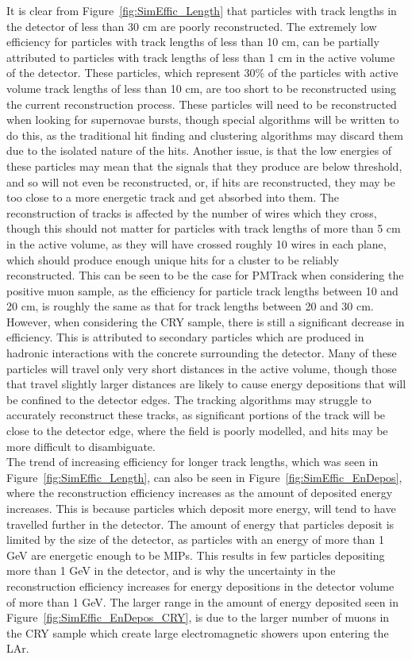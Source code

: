 It is clear from Figure~\ref{fig:SimEffic_Length} that particles with track lengths in the detector of less than 30 cm are poorly reconstructed. The extremely low efficiency for particles with track lengths of less than 10 cm, can be partially attributed to particles with track lengths of less than 1 cm in the active volume of the detector. These particles, which represent 30\% of the particles with active volume track lengths of less than 10 cm, are too short to be reconstructed using the current reconstruction process. These particles will need to be reconstructed when looking for supernovae bursts, though special algorithms will be written to do this, as the traditional hit finding and clustering algorithms may discard them due to the isolated nature of the hits. Another issue, is that the low energies of these particles may mean that the signals that they produce are below threshold, and so will not even be reconstructed, or, if hits are reconstructed, they may be too close to a more energetic track and get absorbed into them. The reconstruction of tracks is affected by the number of wires which they cross, though this should not matter for particles with track lengths of more than 5 cm in the active volume, as they will have crossed roughly 10 wires in each plane, which should produce enough unique hits for a cluster to be reliably reconstructed. This can be seen to be the case for PMTrack when considering the positive muon sample, as the efficiency for particle track lengths between 10 and 20 cm, is roughly the same as that for track lengths between 20 and 30 cm. However, when considering the CRY sample, there is still a significant decrease in efficiency. This is attributed to secondary particles which are produced in hadronic interactions with the concrete surrounding the detector. Many of these particles will travel only very short distances in the active volume, though those that travel slightly larger distances are likely to cause energy depositions that will be confined to the detector edges. The tracking algorithms may struggle to accurately reconstruct these tracks, as significant portions of the track will be close to the detector edge, where the field is poorly modelled, and hits may be more difficult to disambiguate. \\

The trend of increasing efficiency for longer track lengths, which was seen in Figure~\ref{fig:SimEffic_Length}, can also be seen in Figure~\ref{fig:SimEffic_EnDepos}, where the reconstruction efficiency increases as the amount of deposited energy increases. This is because particles which deposit more energy, will tend to have travelled further in the detector. The amount of energy that particles deposit is limited by the size of the detector, as particles with an energy of more than 1 GeV are energetic enough to be MIPs. This results in few particles depositing more than 1 GeV in the detector, and is why the uncertainty in the reconstruction efficiency increases for energy depositions in the detector volume of more than 1 GeV. The larger range in the amount of energy deposited seen in Figure~\ref{fig:SimEffic_EnDepos_CRY}, is due to the larger number of muons in the CRY sample which create large electromagnetic showers upon entering the LAr. \\

